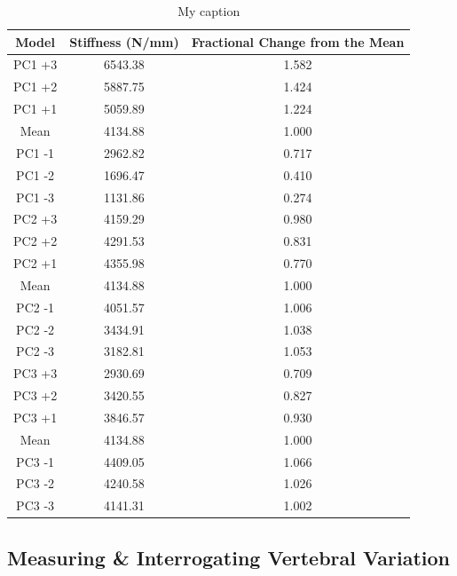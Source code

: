 \begin{table}[]
\centering
\caption{My caption}
\label{tab:stiffness_gen_models}
\begin{tabular}{c|c|c}
Model  & Stiffness (N/mm) & Fractional Change from the Mean \\ \hline \hline
PC1 +3 & 6543.38          & 1.582                           \\
PC1 +2 & 5887.75          & 1.424                           \\
PC1 +1 & 5059.89          & 1.224                           \\
Mean   & 4134.88          & 1.000                           \\
PC1 -1 & 2962.82          & 0.717                           \\
PC1 -2 & 1696.47          & 0.410                           \\
PC1 -3 & 1131.86          & 0.274                           \\ \hline
PC2 +3 & 4159.29          & 0.980                           \\
PC2 +2 & 4291.53          & 0.831                           \\
PC2 +1 & 4355.98          & 0.770                           \\
Mean   & 4134.88          & 1.000                           \\
PC2 -1 & 4051.57          & 1.006                           \\
PC2 -2 & 3434.91          & 1.038                           \\
PC2 -3 & 3182.81          & 1.053                           \\ \hline
PC3 +3 & 2930.69          & 0.709                           \\
PC3 +2 & 3420.55          & 0.827                           \\
PC3 +1 & 3846.57          & 0.930                           \\
Mean   & 4134.88          & 1.000                           \\
PC3 -1 & 4409.05          & 1.066                           \\
PC3 -2 & 4240.58          & 1.026                           \\ \hline
PC3 -3 & 4141.31          & 1.002                          
\end{tabular}
\end{table}


\subsection{Measuring \& Interrogating Vertebral Variation}

